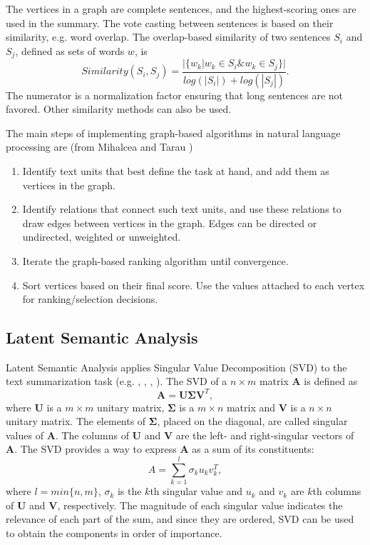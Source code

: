 \documentclass[conference]{IEEEtran}
\begin{document}
The vertices in a graph are complete sentences, and the highest-scoring ones are used in the summary. The vote casting between sentences is based on their similarity, e.g. word overlap. The overlap-based similarity of two sentences $S_i$ and $S_j$, defined as sets of words $w$, is \cite{mihalcea2004}
\begin{equation}
Similarity(S_i,S_j) = \frac{|\{w_k|w_k \in S_i \& w_k \in S_j\}|}{log(|S_i|)+log(|S_j|)}.
\end{equation}
The numerator is a normalization factor ensuring that long sentences are not favored. Other similarity methods can also be used.

The main steps of implementing graph-based algorithms in natural language processing are (from Mihalcea and Tarau \cite{mihalcea2004})
\begin{enumerate}
	\item Identify text units that best define the task at hand,
	and add them as vertices in the graph.
	\item Identify relations that connect such text units, and
	use these relations to draw edges between vertices
	in the graph. Edges can be directed or undirected,
	weighted or unweighted.
	\item Iterate the graph-based ranking algorithm until convergence.
	\item Sort vertices based on their final score. Use the values
	attached to each vertex for ranking/selection decisions.
\end{enumerate}

\subsection{Latent Semantic Analysis}
Latent Semantic Analysis applies Singular Value Decomposition (SVD) to the text summarization task (e.g. \cite{ozsoy2010}, \cite{ozsoy2011}, \cite{steinberger2004}, \cite{gong2001}). The SVD of a $n \times m$ matrix $\mathbf{A}$ is defined as
\begin{equation}
\mathbf{A} = \mathbf{U} \mathbf{\Sigma} \mathbf{V}^T,
\end{equation}
where $\mathbf{U}$ is a $m \times m$ unitary matrix, $\mathbf{\Sigma}$ is a $m \times n$ matrix and $\mathbf{V}$ is a $n \times n$ unitary matrix. The elements of $\mathbf{\Sigma}$, placed on the diagonal, are called singular values of $\mathbf{A}$. The columns of $\mathbf{U}$ and $\mathbf{V}$ are the left- and right-singular vectors of $\mathbf{A}$.  
The SVD provides a way to express $\mathbf{A}$ as a sum of its constituents:
\begin{equation}
A = \sum \limits_{k=1}^{l} \sigma_k u_k v_k^T,
\end{equation} 
where $l=min\{n,m\}$, $\sigma_k$ is the $k$th singular value and $u_k$ and $v_k$ are $k$th columns of $\mathbf{U}$ and $\mathbf{V}$, respectively. The magnitude of each singular value indicates the relevance of each part of the sum, and since they are ordered, SVD can be used to obtain the components in order of importance.
\end{document}
